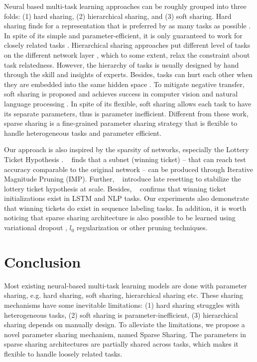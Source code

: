 \documentclass[letterpaper]{article} %
\newcommand{\citet}[1]{\citeauthor{#1}~\shortcite{#1}}
\begin{document}
Neural based multi-task learning approaches can be roughly grouped into three folds: (1) hard sharing, (2) hierarchical sharing, and (3) soft sharing. Hard sharing finds for a representation that is preferred by as many tasks as possible \cite{DBLP:journals/ml/Caruana97}. In spite of its simple and parameter-efficient, it is only guaranteed to work for closely related tasks \cite{DBLP:journals/jair/Baxter00}. Hierarchical sharing approaches put different level of tasks on the different network layer \cite{DBLP:conf/acl/SogaardG16,DBLP:conf/emnlp/HashimotoXTS17}, which to some extent, relax the constraint about task relatedness. However, the hierarchy of tasks is usually designed by hand through the skill and insights of experts. Besides, tasks can hurt each other when they are embedded into the same hidden space \cite{DBLP:conf/eacl/PlankA17}. To mitigate negative transfer, soft sharing is proposed and achieves success in computer vision \cite{DBLP:conf/cvpr/MisraSGH16} and natural language processing \cite{DBLP:conf/aaai/LiuFDQC19,DBLP:conf/aaai/RuderBAS19}. In spite of its flexible, soft sharing allows each task to have its separate parameters, thus is parameter inefficient. Different from these work, sparse sharing is a fine-grained parameter sharing strategy that is flexible to handle heterogeneous tasks and parameter efficient.

Our approach is also inspired by the sparsity of networks, especially the Lottery Ticket Hypothesis \cite{DBLP:conf/iclr/FrankleC19}. \citet{DBLP:conf/iclr/FrankleC19} finds that a subnet (winning ticket) -- that can reach test accuracy comparable to the original network -- can be produced through Iterative Magnitude Pruning (IMP). Further, \citet{frankle2019lottery} introduce late resetting to stabilize the lottery ticket hypothesis at scale. Besides, \citet{yu2019playing} confirms that winning ticket initializations exist in LSTM and NLP tasks. Our experiments also demonstrate that winning tickets do exist in sequence labeling tasks. In addition, it is worth noticing that sparse sharing architecture is also possible to be learned using variational dropout \cite{DBLP:conf/icml/MolchanovAV17}, $l_0$ regularization \cite{louizos2017learning} or other pruning techniques.

\section{Conclusion}
Most existing neural-based multi-task learning models are done with parameter sharing, e.g. hard sharing, soft sharing, hierarchical sharing etc. These sharing mechanisms have some inevitable limitations: (1) hard sharing struggles with heterogeneous tasks, (2) soft sharing is parameter-inefficient, (3) hierarchical sharing depends on manually design. To alleviate the limitations, we propose a novel parameter sharing mechanism, named Sparse Sharing. The parameters in sparse sharing architectures are partially shared across tasks, which makes it flexible to handle loosely related tasks. 
\end{document}
